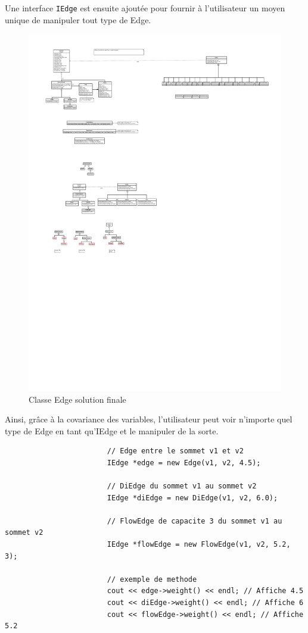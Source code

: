 \documentclass[french]{article}
\begin{document}
			Une interface \lstinline[basicstyle=\ttfamily\color{blue}]|IEdge| est ensuite ajoutée pour fournir à l'utilisateur un moyen unique de manipuler tout type de Edge.
			\begin{figure}[H]
				\centering
				\includegraphics[scale=4.0]{Conception/graph/classedgesol3.pdf}
				\caption{Classe Edge solution finale}
			\end{figure}
			
			Ainsi, grâce à la covariance des variables, l'utilisateur peut voir n'importe quel type de Edge en tant qu'IEdge et le manipuler de la sorte.
			\begin{lstlisting}
						// Edge entre le sommet v1 et v2
						IEdge *edge = new Edge(v1, v2, 4.5);
						
						// DiEdge du sommet v1 au sommet v2
						IEdge *diEdge = new DiEdge(v1, v2, 6.0);
						
						// FlowEdge de capacite 3 du sommet v1 au sommet v2
						IEdge *flowEdge = new FlowEdge(v1, v2, 5.2, 3);
						
						// exemple de methode
						cout << edge->weight() << endl; // Affiche 4.5
						cout << diEdge->weight() << endl; // Affiche 6
						cout << flowEdge->weight() << endl; // Affiche 5.2
			\end{lstlisting}
						
\end{document}
